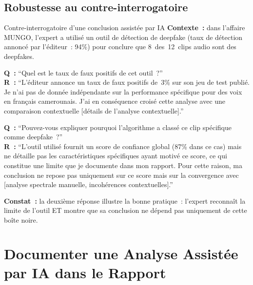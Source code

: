 \subsection{Robustesse au contre-interrogatoire}

\begin{boxscenario}{Contre-interrogatoire d'une conclusion assistée par IA}
\textbf{Contexte~:} dans l'affaire MUNGO, l'expert a utilisé un outil
de détection de deepfake (taux de détection annoncé par l'éditeur~:
94\%) pour conclure que 8~des~12~clips audio sont des deepfakes.

\textbf{Q~:} ``Quel est le taux de faux positifs de cet outil~?''\\
\textbf{R~:} ``L'éditeur annonce un taux de faux positifs de~3\%
sur son jeu de test publié. Je n'ai pas de donnée indépendante
sur la performance spécifique pour des voix en français camerounais.
J'ai en conséquence croisé cette analyse avec une comparaison
contextuelle [détails de l'analyse contextuelle].''

\textbf{Q~:} ``Pouvez-vous expliquer pourquoi l'algorithme a classé
ce clip spécifique comme deepfake~?''\\
\textbf{R~:} ``L'outil utilisé fournit un score de confiance global
(87\% dans ce cas) mais ne détaille pas les caractéristiques
spécifiques ayant motivé ce score, ce qui constitue une limite que
je documente dans mon rapport. Pour cette raison, ma conclusion
ne repose pas uniquement sur ce score mais sur la convergence avec
[analyse spectrale manuelle, incohérences contextuelles].''

\textbf{Constat~:} la deuxième réponse illustre la bonne pratique~:
l'expert reconnaît la limite de l'outil ET montre que sa conclusion
ne dépend pas uniquement de cette boîte noire.
\end{boxscenario}

\section{Documenter une Analyse Assistée par IA dans le Rapport}
\label{sec:documentation-ia}

